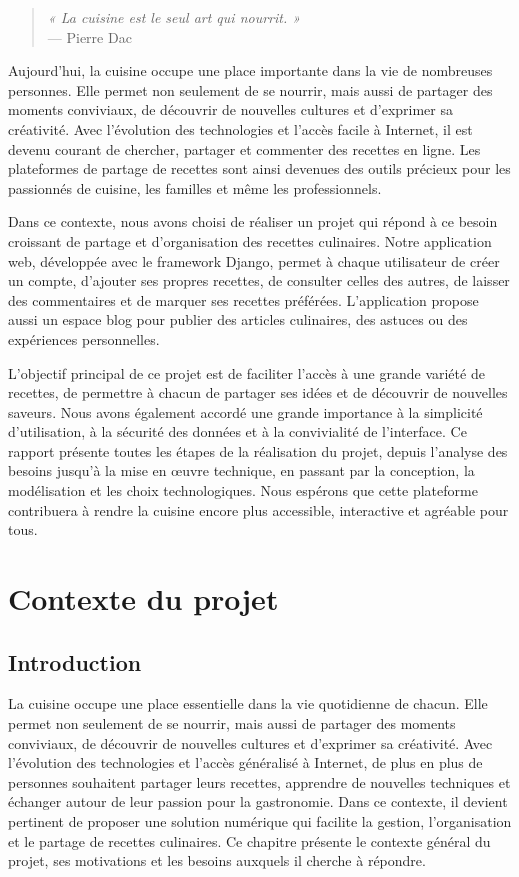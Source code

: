 \documentclass[12pt,a4paper]{report}
\begin{document}
\begin{quote}
    \emph{« La cuisine est le seul art qui nourrit. »} \\
    \hfill --- Pierre Dac
\end{quote}

Aujourd’hui, la cuisine occupe une place importante dans la vie de nombreuses personnes. Elle permet non seulement de se nourrir, mais aussi de partager des moments conviviaux, de découvrir de nouvelles cultures et d’exprimer sa créativité. Avec l’évolution des technologies et l’accès facile à Internet, il est devenu courant de chercher, partager et commenter des recettes en ligne. Les plateformes de partage de recettes sont ainsi devenues des outils précieux pour les passionnés de cuisine, les familles et même les professionnels.

Dans ce contexte, nous avons choisi de réaliser un projet qui répond à ce besoin croissant de partage et d’organisation des recettes culinaires. Notre application web, développée avec le framework Django, permet à chaque utilisateur de créer un compte, d’ajouter ses propres recettes, de consulter celles des autres, de laisser des commentaires et de marquer ses recettes préférées. L’application propose aussi un espace blog pour publier des articles culinaires, des astuces ou des expériences personnelles.

L’objectif principal de ce projet est de faciliter l’accès à une grande variété de recettes, de permettre à chacun de partager ses idées et de découvrir de nouvelles saveurs. Nous avons également accordé une grande importance à la simplicité d’utilisation, à la sécurité des données et à la convivialité de l’interface. Ce rapport présente toutes les étapes de la réalisation du projet, depuis l’analyse des besoins jusqu’à la mise en œuvre technique, en passant par la conception, la modélisation et les choix technologiques. Nous espérons que cette plateforme contribuera à rendre la cuisine encore plus accessible, interactive et agréable pour tous.

\chapter{Contexte du projet}
\section*{Introduction}

La cuisine occupe une place essentielle dans la vie quotidienne de chacun. Elle permet non seulement de se nourrir, mais aussi de partager des moments conviviaux, de découvrir de nouvelles cultures et d’exprimer sa créativité. Avec l’évolution des technologies et l’accès généralisé à Internet, de plus en plus de personnes souhaitent partager leurs recettes, apprendre de nouvelles techniques et échanger autour de leur passion pour la gastronomie. Dans ce contexte, il devient pertinent de proposer une solution numérique qui facilite la gestion, l’organisation et le partage de recettes culinaires. Ce chapitre présente le contexte général du projet, ses motivations et les besoins auxquels il cherche à répondre.
\end{document}
